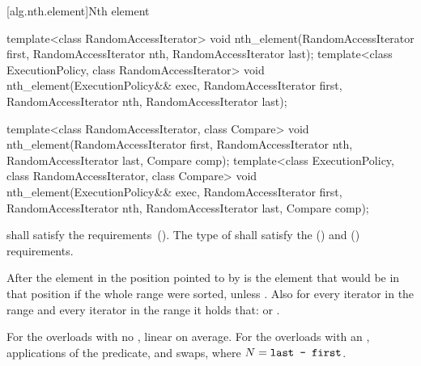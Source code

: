 [alg.nth.element]{Nth element}

%
\begin{itemdecl}
template<class RandomAccessIterator>
  void nth_element(RandomAccessIterator first, RandomAccessIterator nth,
                   RandomAccessIterator last);
template<class ExecutionPolicy, class RandomAccessIterator>
  void nth_element(ExecutionPolicy&& exec,
                   RandomAccessIterator first, RandomAccessIterator nth,
                   RandomAccessIterator last);

template<class RandomAccessIterator, class Compare>
  void nth_element(RandomAccessIterator first, RandomAccessIterator nth,
                   RandomAccessIterator last,  Compare comp);
template<class ExecutionPolicy, class RandomAccessIterator, class Compare>
  void nth_element(ExecutionPolicy&& exec,
                   RandomAccessIterator first, RandomAccessIterator nth,
                   RandomAccessIterator last, Compare comp);
\end{itemdecl}

\begin{itemdescr}
\pnum
\requires
{} shall satisfy the
 requirements~(). The type
of  shall satisfy the
 () and
 () requirements.

\pnum
\effects
After
the element in the position pointed to by 
is the element that would be
in that position if the whole range were sorted, unless .
Also for every iterator
in the range
and every iterator
in the range
it holds that:
or
.

\pnum
\complexity
For the overloads with no , linear on average.
For the overloads with an ,  applications of
the predicate, and  swaps, where $N = \texttt{last - first}$.
\end{itemdescr}

